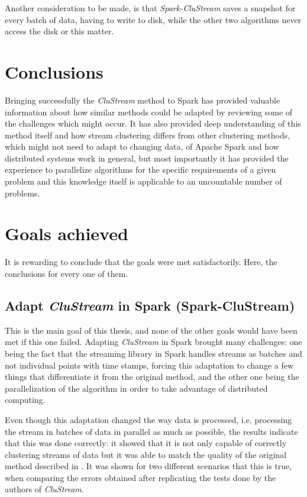 \documentclass[10pt, conference, compsocconf]{IEEEtran}
\begin{document}
Another consideration to be made, is that  \textit{Spark-CluStream} saves a snapshot for every batch of data, having to write to disk, while the other two algorithms never access the disk or this matter.



\section{Conclusions}

 
Bringing successfully the \textit{CluStream} method to Spark has provided valuable information about how similar methods could be adapted by reviewing some of the challenges which might occur. It has also provided deep understanding of this method itself and how stream clustering differs from other clustering methods, which might not need to adapt to changing data, of Apache Spark and how distributed systems work in general, but most importantly it has provided the experience to parallelize algorithms for the specific requirements of a given problem and this knowledge itself is applicable to an uncountable number of problems.


\section{Goals achieved}

It is rewarding to conclude that the goals were met satisfactorily. Here, the conclusions for every one of them.

\subsection{Adapt \textit{CluStream} in Spark (Spark-CluStream)}

This is the main goal of this thesis, and none of the other goals would have been met if this one failed. Adapting \textit{CluStream} in Spark brought many challenges: one being the fact that the streaming library in Spark handles streams as batches and not individual points with time stamps, forcing this adaptation to change a few things that differentiate it from the original method, and the other one being the parallelization of the algorithm in order to take advantage of distributed computing.

Even though this adaptation changed the way data is processed, i.e. processing the stream in batches of data in parallel as much as possible, the results indicate that this was done correctly: it showed that it is not only capable of correctly clustering streams of data but it was able to match the quality of the original method described in \cite{clustreamOrig}. It was shown for two different scenarios that this is true, when comparing the errors obtained after replicating the tests done by the authors of \textit{CluStream}.
\end{document}
